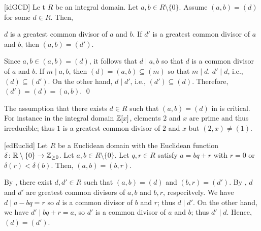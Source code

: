 \documentclass[../modern_algebra_2.tex]{subfiles}
\begin{document}
\begin{Theorem}{}[idGCD]
    Le t \(R\) be an integral domain. Let \(a, b \in R \setminus \{0\}\).
    Assume \((a, b) = (d)\) for some \(d \in R\). Then,
    \begin{enumerate}[label=(\roman*)]
        \ii \(d\) is a greatest common divisor of \(a\) and \(b\).
        \ii If \(d'\) is a greatest common divisor of \(a\) and \(b\), then \((a, b) = (d')\).
    \end{enumerate}
\end{Theorem}
\begin{myclaim}[Proof]\hfill
\begin{enumerate}[label=(\roman*)]
    \ii
    Since \(a, b \in (a, b) = (d)\), it follows that \(d \mid a, b\) so that \(d\) is a common
    divisor of \(a\) and \(b\). If \(m \mid a, b\), then \((d) = (a, b) \subseteq (m)\) so that \(m
    \mid d\).
    \ii
    \(d' \mid d\), i.e., \((d) \subseteq (d')\). On the other hand, \(d \mid d'\), i.e., \((d')
    \subseteq (d)\). Therefore, \((d') = (d) = (a, b)\).
    \qed
\end{enumerate}
\end{myclaim}

\begin{note}
    The assumption that there exists \(d \in R\) such that \((a, b) = (d)\)
    in  is critical. For instance in the integral domain \(\ZZ{}[x]\),
    elements \(2\) and \(x\) are prime and thus irreducible; thus \(1\) is a greatest common
    divisor of \(2\) and \(x\) but \((2, x) \neq (1)\).
\end{note}

\begin{Lemma}{}[edEuclid]
    Let \(R\) be a Euclidean domain with the Euclidean function \(\delta \colon \RR \setminus \{0\}
    \to \ZZ_{\ge 0}\). Let \(a, b \in R \setminus \{0\}\).
    Let \(q, r \in R\) satisfy \(a = bq + r\) with \(r = 0\) or \(\delta(r) < \delta(b)\).
    Then, \((a, b) = (b, r)\).
\end{Lemma}
\begin{myproof}[Proof]
    By , there exist \(d, d' \in R\) such that \((a, b) = (d)\) and \((b, r) =
    (d')\). By , \(d\) and \(d'\) are greatest common divisors of \(a, b\) and \(b,
    r\), respecitvely. We have \(d \mid a - bq = r\) so \(d\) is a common divisor of \(b\) and
    \(r\); thus \(d \mid d'\). On the other hand, we have \(d' \mid bq + r = a\), so \(d'\) is a
    common divisor of \(a\) and \(b\); thus \(d' \mid d\). Hence, \((d) = (d')\).
\end{myproof}
\end{document}
